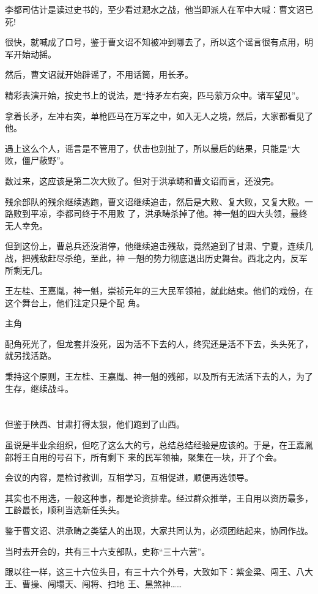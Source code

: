 \documentclass[11pt,a4paper,onecolumn]{article}
\begin{document}
李都司估计是读过史书的，至少看过淝水之战，他当即派人在军中大喊：曹文诏已死!

很快，就喊成了口号，鉴于曹文诏不知被冲到哪去了，所以这个谣言很有点用，明军开始动摇。

然后，曹文诏就开始辟谣了，不用话筒，用长矛。

精彩表演开始，按史书上的说法，是``持矛左右突，匹马萦万众中。诸军望见''。

拿着长矛，左冲右突，单枪匹马在万军之中，如入无人之境，然后，大家都看见了他。

遇上这么个人，谣言是不管用了，伏击也别扯了，所以最后的结果，只能是``大败，僵尸蔽野''。

数过来，这应该是第二次大败了。但对于洪承畴和曹文诏而言，还没完。

残余部队的残余继续逃跑，曹文诏继续追击，然后是大败、复大败，又复大败。一路败到平凉，李都司终于不用败
了，洪承畴杀掉了他。神一魁的四大头领，最终无人幸免。

但到这份上，曹总兵还没消停，他继续追击残敌，竟然追到了甘肃、宁夏，连续几战，把残敌赶尽杀绝，至此，神
一魁的势力彻底退出历史舞台。西北之内，反军所剩无几。

王左桂、王嘉胤，神一魁，崇祯元年的三大民军领袖，就此结束。他们的戏份，在这个舞台上，他们注定只是个配
角。

主角

配角死光了，但龙套并没死，因为活不下去的人，终究还是活不下去，头头死了，就另找活路。

秉持这个原则，王左桂、王嘉胤、神一魁的残部，以及所有无法活下去的人，为了生存，继续战斗。

\section[\thesection]{}

但鉴于陕西、甘肃打得太狠，他们跑到了山西。

虽说是半业余组织，但吃了这么大的亏，总结总结经验是应该的。于是，在王嘉胤部将王自用的号召下，所有剩下
来的民军领袖，聚集在一块，开了个会。

会议的内容，是检讨教训，互相学习，互相促进，顺便再选领导。

其实也不用选，一般这种事，都是论资排辈。经过群众推举，王自用以资历最多，工龄最长，顺利当选新任头头。

鉴于曹文诏、洪承畴之类猛人的出现，大家共同认为，必须团结起来，协同作战。

当时去开会的，共有三十六支部队，史称``三十六营''。

跟以往一样，这三十六位头目，有三十六个外号，大致如下：紫金梁、闯王、八大王、曹操、闯塌天、闯将、扫地
王、黑煞神……
\end{document}

